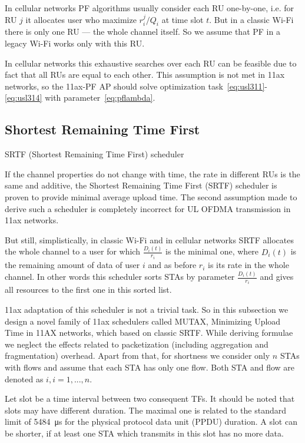In cellular networks PF algorithms usually consider each RU one-by-one, i.e. for RU $j$ it allocates user who maximize $r_i^j / Q_i$ at time slot $t$. But in a classic Wi-Fi there is only one RU --- the whole channel itself. So we assume that PF in a legacy Wi-Fi works only with this RU.

In cellular networks this exhaustive searches over each RU can be feasible due to fact that all RUs are equal to each other. This assumption is not met in 11ax networks, so the 11ax-PF AP should solve optimization task~\eqref{eq:usl311}-\eqref{eq:usl314} with parameter~\eqref{eq:pflambda}.


\subsection{Shortest Remaining Time First}

SRTF (Shortest Remaining Time First) scheduler

If the channel properties do not change with time, the rate in different RUs is the same and additive, the Shortest Remaining Time First (SRTF) scheduler is proven to provide minimal average upload time. 
The second assumption made to derive such a scheduler is completely incorrect for UL OFDMA transmission in 11ax networks.

But still, simplistically, in classic Wi-Fi and in cellular networks SRTF allocates the whole channel to a user for which $\frac{D_i(t)}{r_i}$ is the minimal one, where $D_i(t)$ is the remaining amount of data of user $i$ and as before $r_i$ is its rate in the whole channel. In other words this scheduler sorts STAs by parameter $\frac{D_i(t)}{r_i}$ and gives all resources to the first one in this sorted list.

11ax adaptation of this scheduler is not a trivial task. So in this subsection we design a novel family of 11ax schedulers called MUTAX, Minimizing Upload Time in 11AX networks, which based on classic SRTF.
While deriving formulae we neglect the effects related to packetization (including aggregation and fragmentation) overhead. Apart from that, for shortness we consider only $n$ STAs with flows and assume that each STA has only one flow. Both STA and flow are denoted as $i, i=1,...,n$.

Let slot be a time interval between two consequent TFs.
It should be noted that slots may have different duration. The maximal one is related to the standard limit of \SI{5484}{\us} for the physical protocol data unit (PPDU) duration. A slot can be shorter, if at least one STA which transmits in this slot has no more data.

